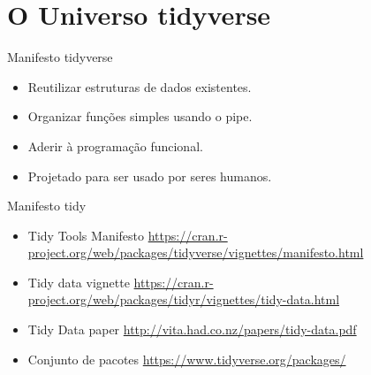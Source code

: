 \documentclass[
  10pt,
  ignorenonframetext,
]{beamer}
\begin{document}
\hypertarget{o-universo-tidyverse}{%
\section{O Universo tidyverse}\label{o-universo-tidyverse}}

\begin{frame}{Manifesto tidyverse}
\protect\hypertarget{manifesto-tidyverse}{}
\begin{itemize}
\item
  Reutilizar estruturas de dados existentes.
\item
  Organizar funções simples usando o pipe.
\item
  Aderir à programação funcional.
\item
  Projetado para ser usado por seres humanos.
\end{itemize}
\end{frame}

\begin{frame}{Manifesto tidy}
\protect\hypertarget{manifesto-tidy}{}
\begin{itemize}
\item
  Tidy Tools Manifesto
  \url{https://cran.r-project.org/web/packages/tidyverse/vignettes/manifesto.html}
\item
  Tidy data vignette
  \url{https://cran.r-project.org/web/packages/tidyr/vignettes/tidy-data.html}
\item
  Tidy Data paper \url{http://vita.had.co.nz/papers/tidy-data.pdf}
\item
  Conjunto de pacotes \url{https://www.tidyverse.org/packages/}
\end{itemize}
\end{frame}
\end{document}
